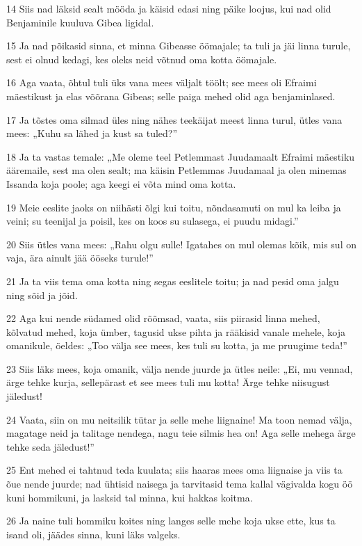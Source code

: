 \par 14 Siis nad läksid sealt mööda ja käisid edasi ning päike loojus, kui nad olid Benjaminile kuuluva Gibea ligidal.
\par 15 Ja nad põikasid sinna, et minna Gibeasse öömajale; ta tuli ja jäi linna turule, sest ei olnud kedagi, kes oleks neid võtnud oma kotta öömajale.
\par 16 Aga vaata, õhtul tuli üks vana mees väljalt töölt; see mees oli Efraimi mäestikust ja elas võõrana Gibeas; selle paiga mehed olid aga benjaminlased.
\par 17 Ja tõstes oma silmad üles ning nähes teekäijat meest linna turul, ütles vana mees: „Kuhu sa lähed ja kust sa tuled?”
\par 18 Ja ta vastas temale: „Me oleme teel Petlemmast Juudamaalt Efraimi mäestiku ääremaile, sest ma olen sealt; ma käisin Petlemmas Juudamaal ja olen minemas Issanda koja poole; aga keegi ei võta mind oma kotta.
\par 19 Meie eeslite jaoks on niihästi õlgi kui toitu, nõndasamuti on mul ka leiba ja veini; su teenijal ja poisil, kes on koos su sulasega, ei puudu midagi.”
\par 20 Siis ütles vana mees: „Rahu olgu sulle! Igatahes on mul olemas kõik, mis sul on vaja, ära ainult jää ööseks turule!”
\par 21 Ja ta viis tema oma kotta ning segas eeslitele toitu; ja nad pesid oma jalgu ning sõid ja jõid.
\par 22 Aga kui nende südamed olid rõõmsad, vaata, siis piirasid linna mehed, kõlvatud mehed, koja ümber, tagusid ukse pihta ja rääkisid vanale mehele, koja omanikule, öeldes: „Too välja see mees, kes tuli su kotta, ja me pruugime teda!”
\par 23 Siis läks mees, koja omanik, välja nende juurde ja ütles neile: „Ei, mu vennad, ärge tehke kurja, sellepärast et see mees tuli mu kotta! Ärge tehke niisugust jäledust!
\par 24 Vaata, siin on mu neitsilik tütar ja selle mehe liignaine! Ma toon nemad välja, magatage neid ja talitage nendega, nagu teie silmis hea on! Aga selle mehega ärge tehke seda jäledust!”
\par 25 Ent mehed ei tahtnud teda kuulata; siis haaras mees oma liignaise ja viis ta õue nende juurde; nad ühtisid naisega ja tarvitasid tema kallal vägivalda kogu öö kuni hommikuni, ja lasksid tal minna, kui hakkas koitma.
\par 26 Ja naine tuli hommiku koites ning langes selle mehe koja ukse ette, kus ta isand oli, jäädes sinna, kuni läks valgeks.
